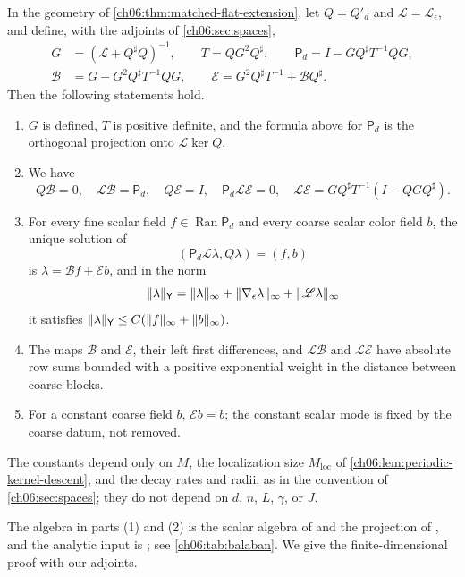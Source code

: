 \begin{lemma}\label{ch06:lem:scalar-gauge-inverse}
In the geometry of \cref{ch06:thm:matched-flat-extension}, let $Q=Q'_d$ and $\mathscr L=\mathscr L_\epsilon$, and define, with the adjoints of \cref{ch06:sec:spaces},
\[
 \begin{aligned}
 G&=(\mathscr L+Q^\sharp Q)^{-1},\qquad T=QG^2Q^\sharp,\qquad\mathsf P_d=I-GQ^\sharp T^{-1}QG,\\
 \mathscr B&=G-G^2Q^\sharp T^{-1}QG,\qquad\mathscr E=G^2Q^\sharp T^{-1}+\mathscr BQ^\sharp.
 \end{aligned}
\]
Then the following statements hold.
\begin{enumerate}
\item $G$ is defined, $T$ is positive definite, and the formula above for $\mathsf P_d$ is the orthogonal projection onto $\mathscr L\ker Q$.
\item We have
\[
 Q\mathscr B=0,\quad\mathscr L\mathscr B=\mathsf P_d,\quad Q\mathscr E=I,\quad\mathsf P_d\mathscr L\mathscr E=0,\quad\mathscr L\mathscr E=GQ^\sharp T^{-1}(I-QGQ^\sharp).
\]
\item For every fine scalar field $f\in\operatorname{Ran}\mathsf P_d$ and every coarse scalar color field $b$, the unique solution of
\[
 (\mathsf P_d\mathscr L\lambda,Q\lambda)=(f,b)
\]
is $\lambda=\mathscr Bf+\mathscr Eb$, and in the norm
\[
 \lVert \lambda\rVert_{\mathsf Y}=\lVert \lambda\rVert_\infty+\lVert \nabla_\epsilon\lambda\rVert_\infty+\lVert \mathscr L\lambda\rVert_\infty
\]
it satisfies $\lVert \lambda\rVert_{\mathsf Y}\le C(\lVert f\rVert_\infty+\lVert b\rVert_\infty)$.
\item The maps $\mathscr B$ and $\mathscr E$, their left first differences, and $\mathscr L\mathscr B$ and $\mathscr L\mathscr E$ have absolute row sums bounded with a positive exponential weight in the distance between coarse blocks.
\item For a constant coarse field $b$, $\mathscr Eb=b$; the constant scalar mode is fixed by the coarse datum, not removed.
\end{enumerate}
The constants depend only on $M$, the localization size $M_{\mathrm{loc}}$ of \cref{ch06:lem:periodic-kernel-descent}, and the decay rates and radii, as in the convention of \cref{ch06:sec:spaces}; they do not depend on $d$, $n$, $L$, $\gamma$, or $J$.
\end{lemma}

The algebra in parts (1) and (2) is the scalar algebra of \cite[(1.43)--(1.45), pp.~25--26]{Balaban1984I} and the projection of \cite[(2.17), p.~225]{Balaban1984II}, and the analytic input is \cite[Theorems~3.1 and 3.2]{Balaban1985Background}; see \cref{ch06:tab:balaban}. We give the finite-dimensional proof with our adjoints.


